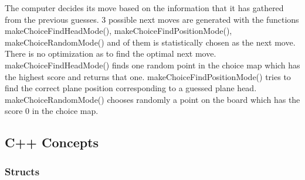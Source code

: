The computer decides its move based on the information that it has gathered from the previous guesses. 3 possible next moves are generated with the functions makeChoiceFindHeadMode(),  makeChoiceFindPositionMode(),  makeChoiceRandomMode() and of them is statistically chosen as the next move. There is no optimization as to find the optimal next move. makeChoiceFindHeadMode() finds one random point in the choice map which has the highest score and returns that one. makeChoiceFindPositionMode() tries to find the correct plane position corresponding to a guessed plane head. makeChoiceRandomMode() chooses randomly a point on the board which has the score 0 in the choice map.





\subsection{C++ Concepts}


\subsubsection{Structs}
